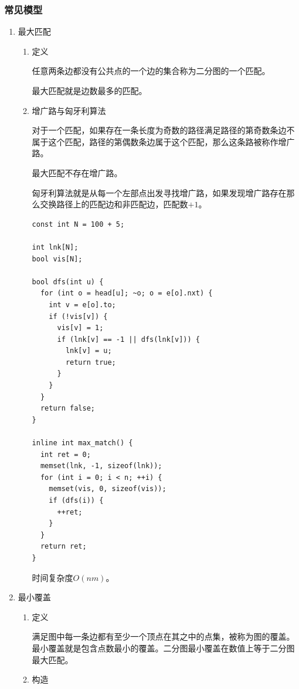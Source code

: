 \documentclass[11pt]{article}
\begin{document}
\subsubsection{常见模型}
\label{sec:orga91323f}
\begin{enumerate}
\item 最大匹配
\label{sec:org30d6b28}
\begin{enumerate}
\item 定义
\label{sec:org5b23595}

任意两条边都没有公共点的一个边的集合称为二分图的一个匹配。

最大匹配就是边数最多的匹配。

\item 增广路与匈牙利算法
\label{sec:org44502a0}

对于一个匹配，如果存在一条长度为奇数的路径满足路径的第奇数条边不属于这个匹配，路径的第偶数条边属于这个匹配，那么这条路被称作增广路。

最大匹配不存在增广路。

匈牙利算法就是从每一个左部点出发寻找增广路，如果发现增广路存在那么交换路径上的匹配边和非匹配边，匹配数\(+1\)。

\begin{verbatim}
const int N = 100 + 5;

int lnk[N];
bool vis[N];

bool dfs(int u) {
  for (int o = head[u]; ~o; o = e[o].nxt) {
    int v = e[o].to;
    if (!vis[v]) {
      vis[v] = 1;
      if (lnk[v] == -1 || dfs(lnk[v])) {
        lnk[v] = u;
        return true;
      }
    }
  }
  return false;
}

inline int max_match() {
  int ret = 0;
  memset(lnk, -1, sizeof(lnk));
  for (int i = 0; i < n; ++i) {
    memset(vis, 0, sizeof(vis));
    if (dfs(i)) {
      ++ret;
    }
  }
  return ret;
}
\end{verbatim}

时间复杂度\(O(nm)\)。
\end{enumerate}

\item 最小覆盖
\label{sec:org70b0c59}
\begin{enumerate}
\item 定义
\label{sec:org3b56653}

满足图中每一条边都有至少一个顶点在其之中的点集，被称为图的覆盖。最小覆盖就是包含点数最小的覆盖。二分图最小覆盖在数值上等于二分图最大匹配。

\item 构造
\label{sec:orgb4d539b}


\end{enumerate}
\end{enumerate}
\end{document}

